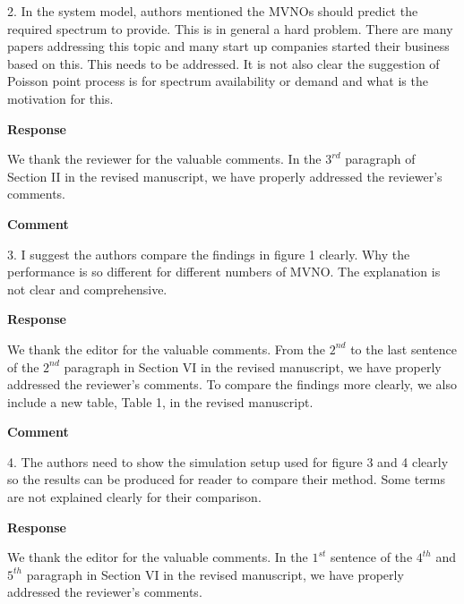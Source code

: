 \documentclass[12pt,draftcls, onecolumn]{IEEEtran}
\begin{document}
2. In the system model, authors mentioned the MVNOs should predict the required spectrum to provide. This is in general a hard problem. There are many papers addressing this topic and many start up companies started their business based on this. This needs to be addressed. It is not also clear the suggestion of Poisson point process is for spectrum availability or demand and what is the motivation for this.

\vspace{3mm} \noindent\textcolor[rgb]{0.00,0.00,1.00}{\textbf{Response}}
\vspace{2mm}

We thank the reviewer for the valuable comments. In the $ 3^{rd} $ paragraph of Section II in the revised manuscript, we have properly addressed the reviewer's comments.


\vspace{3mm}
\noindent\textcolor[rgb]{1.00,0.00,0.00}{\textbf{Comment}}
\vspace{3mm}

3. I suggest the authors compare the findings in figure 1 clearly. Why the performance is so different for different numbers of MVNO. The explanation is not clear and comprehensive.

\vspace{3mm}
\noindent\textcolor[rgb]{0.00,0.00,1.00}{\textbf{Response}}
\vspace{3mm}

We thank the editor for the valuable comments. From the $ 2^{nd} $ to the last sentence of the $ 2^{nd} $ paragraph in Section VI in the revised manuscript, we have properly addressed the reviewer's comments. To compare the findings more clearly, we also include a new table, Table 1, in the revised manuscript.

\vspace{3mm}
\noindent\textcolor[rgb]{1.00,0.00,0.00}{\textbf{Comment}}
\vspace{3mm}

4. The authors need to show the simulation setup used for figure 3 and 4 clearly so the results can be produced for reader to compare their method. Some terms are not explained clearly for their comparison.

\vspace{3mm}
\noindent\textcolor[rgb]{0.00,0.00,1.00}{\textbf{Response}}
\vspace{3mm}

We thank the editor for the valuable comments. In the $ 1^{st} $ sentence of the $ 4^{th} $ and $ 5^{th} $ paragraph in Section VI in the revised manuscript, we have properly addressed the reviewer's comments. 
\end{document}
